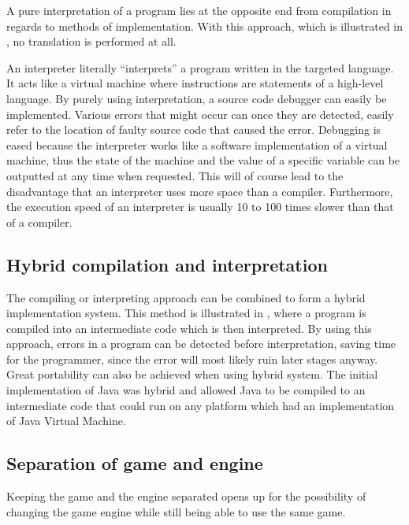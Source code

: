 A pure interpretation of a program lies at the opposite end from compilation in
regards to methods of implementation. With this approach, which is illustrated in
, no translation is performed at all.



An interpreter literally ``interprets'' a program written in the targeted language. It
acts like a virtual machine where instructions are statements of a high-level
language. By purely using interpretation, a source code debugger can easily be
implemented. Various errors that might occur can once they are detected, easily
refer to the location of faulty source code that caused the error. Debugging is
eased because the interpreter works like a software implementation of a virtual
machine, thus the state of the machine and the value of a specific variable can
be outputted at any time when requested. This will of course lead to the
disadvantage that an interpreter uses more space than a compiler. Furthermore,
the execution speed of an interpreter is usually 10 to 100 times slower than
that of a compiler.
\cite[p. 48]{sebesta2013}

\subsection{Hybrid compilation and interpretation}
The compiling or interpreting approach can be combined to form
a hybrid implementation system. This method is illustrated in
, where a program is compiled into
an intermediate code which is then interpreted. By using this approach,
errors in a program can be detected before interpretation, saving time
for the programmer, since the error will most likely ruin later stages
anyway. Great portability can also be achieved when using hybrid system.
The initial implementation of Java was hybrid and allowed Java to be
compiled to an intermediate code that could run on any platform which
had an implementation of Java Virtual Machine. \cite[p. 50]{sebesta2013}



\subsection{Separation of game and engine}
\label{subsec:engineseperation}
Keeping the game and the engine separated opens up for the possibility of
changing the game engine while still being able to use the same game. 

